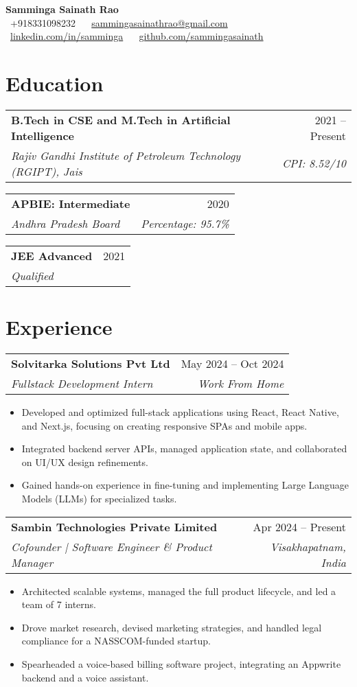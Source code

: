 \documentclass[a4paper]{article}
\makeatletter
\newcommand{\resumeSubheading}[4]{
  \vspace{-1pt}\item
    \begin{tabular*}{\textwidth}{l@{\extracolsep{\fill}}r}
      \textbf{#1} & #2 \\
      \textit{\small#3} & \textit{\small #4} \\
    \end{tabular*}\vspace{-5pt}
}
\makeatother
\begin{document}
\begin{center}
    \textbf{\Huge Samminga Sainath Rao} \\
    \small \faPhone\ +918331098232 ~ \faEnvelope\ \href{mailto:sammingasainathrao@gmail.com}{sammingasainathrao@gmail.com} ~ 
    \faLinkedin\ \href{https://www.linkedin.com/in/samminga}{linkedin.com/in/samminga} ~ 
    \faGithub\ \href{https://github.com/sammingasainath}{github.com/sammingasainath}
\end{center}

\section{Education}
\begin{resumeSubHeadingList}
    \resumeSubheading
    {B.Tech in CSE and M.Tech in Artificial Intelligence}{2021 -- Present}
    {Rajiv Gandhi Institute of Petroleum Technology (RGIPT), Jais}{CPI: 8.52/10}
    \resumeSubheading
    {APBIE: Intermediate}{2020}
    {Andhra Pradesh Board}{Percentage: 95.7\%}
    \resumeSubheading
    {JEE Advanced}{2021}
    {Qualified}{}
\end{resumeSubHeadingList}

\section{Experience}
\begin{resumeSubHeadingList}
    \resumeSubheading
    {Solvitarka Solutions Pvt Ltd}{May 2024 -- Oct 2024}
    {Fullstack Development Intern}{Work From Home}
    \begin{itemize}[label={\small$\bullet$}, itemsep=-2pt]
        \item Developed and optimized full-stack applications using React, React Native, and Next.js, focusing on creating responsive SPAs and mobile apps.
        \item Integrated backend server APIs, managed application state, and collaborated on UI/UX design refinements.
        \item Gained hands-on experience in fine-tuning and implementing Large Language Models (LLMs) for specialized tasks.
    \end{itemize}

    \resumeSubheading
    {Sambin Technologies Private Limited}{Apr 2024 -- Present}
    {Cofounder | Software Engineer \& Product Manager}{Visakhapatnam, India}
    \begin{itemize}[label={\small$\bullet$}, itemsep=-2pt]
        \item Architected scalable systems, managed the full product lifecycle, and led a team of 7 interns.
        \item Drove market research, devised marketing strategies, and handled legal compliance for a NASSCOM-funded startup.
        \item Spearheaded a voice-based billing software project, integrating an Appwrite backend and a voice assistant.
    \end{itemize}
\end{resumeSubHeadingList}
\end{document}
